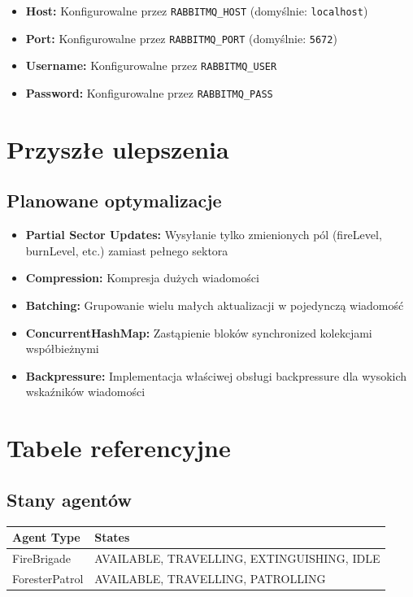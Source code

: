 \begin{itemize}
    \item \textbf{Host:} Konfigurowalne przez \texttt{RABBITMQ\_HOST} (domyślnie: \texttt{localhost})
    \item \textbf{Port:} Konfigurowalne przez \texttt{RABBITMQ\_PORT} (domyślnie: \texttt{5672})
    \item \textbf{Username:} Konfigurowalne przez \texttt{RABBITMQ\_USER}
    \item \textbf{Password:} Konfigurowalne przez \texttt{RABBITMQ\_PASS}
\end{itemize}

\section{Przyszłe ulepszenia}

\subsection{Planowane optymalizacje}

\begin{itemize}
    \item \textbf{Partial Sector Updates:} Wysyłanie tylko zmienionych pól (fireLevel, burnLevel, etc.) zamiast pełnego sektora
    \item \textbf{Compression:} Kompresja dużych wiadomości
    \item \textbf{Batching:} Grupowanie wielu małych aktualizacji w pojedynczą wiadomość
    \item \textbf{ConcurrentHashMap:} Zastąpienie bloków synchronized kolekcjami współbieżnymi
    \item \textbf{Backpressure:} Implementacja właściwej obsługi backpressure dla wysokich wskaźników wiadomości
\end{itemize}

\section{Tabele referencyjne}

\subsection{Stany agentów}

\begin{longtable}{|l|l|}
\hline
\textbf{Agent Type} & \textbf{States} \\
\hline
FireBrigade & AVAILABLE, TRAVELLING, EXTINGUISHING, IDLE \\
\hline
ForesterPatrol & AVAILABLE, TRAVELLING, PATROLLING \\
\hline
\end{longtable}

